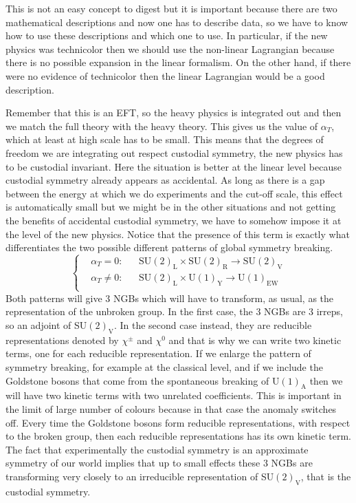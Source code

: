\documentclass[../main.tex]{subfiles}
\begin{document}
\begin{kaobox}[frametitle=Remark]
This is not an easy concept to digest but it is important because there are two mathematical descriptions and now one has to describe data, so we have to know how to use these descriptions and which one to use. In particular, if the new physics was technicolor then we should use the non-linear Lagrangian because there is no possible expansion in the linear formalism. On the other hand, if there were no evidence of technicolor then the linear Lagrangian would be a good description.
\end{kaobox}
Remember that this is an EFT, so the heavy physics is integrated out and then we match the full theory with the heavy theory. This gives us the value of $\alpha_T$, which at least at high scale has to be small. This means that the degrees of freedom we are integrating out respect custodial symmetry, the new physics has to be custodial invariant. Here the situation is better at the linear level because custodial symmetry already appears as accidental. As long as there is a gap between the energy at which we do experiments and the cut-off scale, this effect is automatically small but we might be in the other situations and not getting the benefits of accidental custodial symmetry, we have to somehow impose it at the level of the new physics. Notice that the presence of this term is exactly what differentiates the two possible different patterns of global symmetry breaking.
\[
\left\{
\begin{aligned}
&\alpha_T=0: &&\text{SU$(2)_{\text{L}}\times$SU$(2)_{\text{R}}\to$SU$(2)_{\text{V}}$}\\
&\alpha_T\neq0: &&\text{SU$(2)_{\text{L}}\times$U$(1)_{\text{Y}}\to$U$(1)_{\text{EW}}$}\\
\end{aligned}
\right.
\]
Both patterns will give 3 NGBs which will have to transform, as usual, as the representation of the unbroken group. In the first case, the 3 NGBs are 3 irreps, so an adjoint of SU$(2)_{\text{V}}$. In the second case instead, they are reducible representations denoted by $\chi^\pm$ and $\chi^0$ and that is why we can write two kinetic terms, one for each reducible representation. If we enlarge the pattern of symmetry breaking, for example at the classical level, and if we include the Goldstone bosons that come from the spontaneous breaking of U$(1)_{\text{A}}$ then we will have two kinetic terms with two unrelated coefficients. This is important in the limit of large number of colours because in that case the anomaly switches off. Every time the Goldstone bosons form reducible representations, with respect to the broken group, then each reducible representations has its own kinetic term. The fact that experimentally the custodial symmetry is an approximate symmetry of our world implies that up to small effects these 3 NGBs are transforming very closely to an irreducible representation of SU$(2)_{\text{V}}$, that is the custodial symmetry. 
\end{document}
